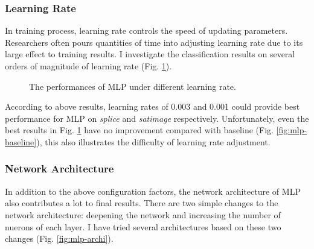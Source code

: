 \documentclass[12pt,a4paper]{article}
\theoremstyle{definition}
\begin{document}
\subsubsection{Learning Rate}

In training process, learning rate controls the speed of updating parameters. Researchers often pours quantities of time into adjusting learning rate due to its large effect to training results. I investigate the classification results on several orders of magnitude of learning rate (Fig. \ref{fig:mlp-lr}).

\begin{figure}[H]
	\centering
	\caption{The performances of MLP under different learning rate.}
	\label{fig:mlp-lr}
\end{figure}

According to above results, learning rates of 0.003 and 0.001 could provide best performance for MLP on \textit{splice} and \textit{satimage} respectively. Unfortunately, even the best results in Fig. \ref{fig:mlp-lr} have no improvement compared with baseline (Fig. \ref{fig:mlp-baseline}), this also illustrates the difficulty of learning rate adjustment.

\subsubsection{Network Architecture}

In addition to the above configuration factors, the network architecture of MLP also contributes a lot to final results. There are two simple changes to the network architecture: deepening the network and increasing the number of nuerons of each layer. I have tried several architectures based on these two changes (Fig. \ref{fig:mlp-archi}).
\end{document}
